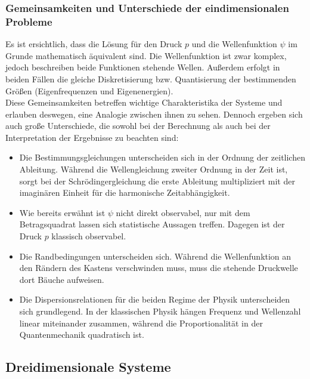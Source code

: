 \subsubsection{Gemeinsamkeiten und Unterschiede der eindimensionalen Probleme}
Es ist ersichtlich, dass die Lösung für den Druck $p$ und die Wellenfunktion $\psi$ im Grunde mathematisch äquivalent sind. Die Wellenfunktion ist zwar komplex, jedoch beschreiben beide Funktionen stehende Wellen. Außerdem erfolgt in beiden Fällen die gleiche Diskretisierung bzw. Quantisierung der bestimmenden Größen (Eigenfrequenzen und Eigenenergien).\\
Diese Gemeinsamkeiten betreffen wichtige Charakteristika der Systeme und erlauben deswegen, eine Analogie zwischen ihnen zu sehen. Dennoch ergeben sich auch große Unterschiede, die sowohl bei der Berechnung als auch bei der Interpretation der Ergebnisse zu beachten sind:
\begin{itemize}
  \item Die Bestimmungsgleichungen unterscheiden sich in der Ordnung der zeitlichen Ableitung. Während die Wellengleichung zweiter Ordnung in der Zeit ist, sorgt bei der Schrödingergleichung die erste Ableitung multipliziert mit der imaginären Einheit für die harmonische Zeitabhängigkeit.
  \item Wie bereits erwähnt ist $\psi$ nicht direkt observabel, nur mit dem Betragsquadrat lassen sich statistische Aussagen treffen. Dagegen ist der Druck $p$ klassisch observabel.
  \item Die Randbedingungen unterscheiden sich. Während die Wellenfunktion an den Rändern des Kastens verschwinden muss, muss die stehende Druckwelle dort Bäuche aufweisen.
  \item Die Dispersionsrelationen für die beiden Regime der Physik unterscheiden sich grundlegend. In der klassischen Physik hängen Frequenz und Wellenzahl linear miteinander zusammen, während die Proportionalität in der Quantenmechanik quadratisch ist.
\end{itemize}

\subsection{Dreidimensionale Systeme}
\label{subsec:dreidimsyst}

